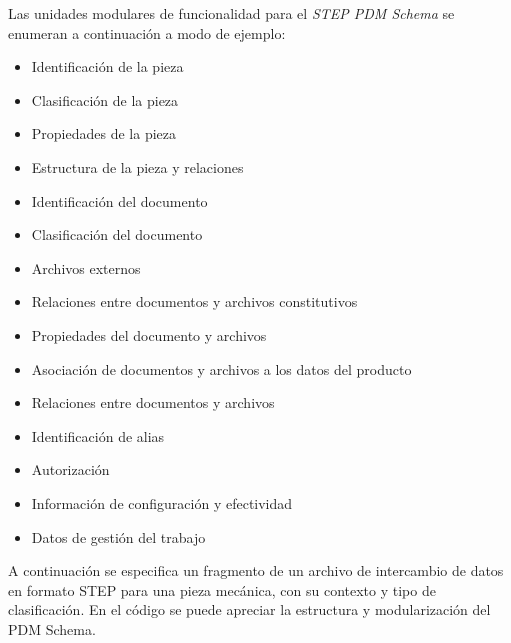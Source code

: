 Las unidades modulares de funcionalidad para el \textit{STEP PDM Schema} se enumeran a continuación a modo de ejemplo:

\begin{itemize}
    \item Identificación de la pieza
    \item Clasificación de la pieza
    \item Propiedades de la pieza
    \item Estructura de la pieza y relaciones
    \item Identificación del documento
    \item Clasificación del documento
    \item Archivos externos
    \item Relaciones entre documentos y archivos constitutivos
    \item Propiedades del documento y archivos
    \item Asociación de documentos y archivos a los datos del producto
    \item Relaciones entre documentos y archivos
    \item Identificación de alias
    \item Autorización
    \item Información de configuración y efectividad
    \item Datos de gestión del trabajo
\end{itemize}

A continuación se especifica un fragmento de un archivo de intercambio de datos en formato STEP para una pieza mecánica, con su contexto y tipo de clasificación. En el código se puede apreciar la estructura y modularización del PDM Schema.

